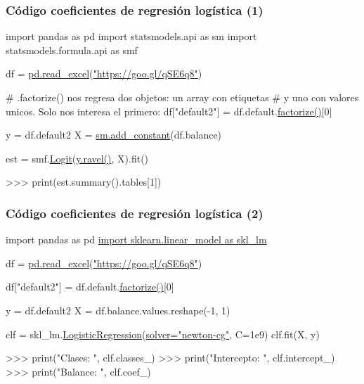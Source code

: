 \documentclass[usenames,dvipsnames]{beamer} %
\begin{document}
\begin{frame}[fragile]\frametitle{C\'odigo coeficientes de regresi\'on log\'istica (1)}
\begin{semiverbatim}
	\small{\textcolor{deepblue}{import} pandas \textcolor{deepblue}{as} pd
	\textcolor{deepblue}{import} statsmodels.api \textcolor{deepblue}{as} sm
	\textcolor{deepblue}{import} statsmodels.formula.api \textcolor{deepblue}{as} smf
	
	df = \href{https://pandas.pydata.org/pandas-docs/stable/reference/api/pandas.read_excel.html}{pd.read\_excel}(\href{https://goo.gl/qSE6q8}{"https://goo.gl/qSE6q8"})
	
	# .factorize() nos regresa dos objetos: un array con etiquetas
	# y uno con valores unicos. Solo nos interesa el primero:
	df["default2"] = df.default.\href{https://pandas.pydata.org/pandas-docs/version/0.23.4/generated/pandas.factorize.html}{factorize()}[0]
	
	y = df.default2
	X = \href{http://www.statsmodels.org/devel/generated/statsmodels.tools.tools.add_constant}{sm.add\_constant}(df.balance)
	
	est = smf.\href{https://www.statsmodels.org/dev/generated/statsmodels.discrete.discrete_model.Logit.html}{Logit}(\href{https://docs.scipy.org/doc/numpy-1.15.0/reference/generated/numpy.ravel.html}{y.ravel()}, X).fit()
	
	>>> print(est.summary().tables[1])
}
\end{semiverbatim}
\end{frame}

\begin{frame}[fragile]\frametitle{C\'odigo coeficientes de regresi\'on log\'istica (2)}
\begin{semiverbatim}
	\small{\textcolor{deepblue}{import} pandas \textcolor{deepblue}{as} pd
		\href{https://scikit-learn.org/stable/modules/classes.html#module-sklearn.linear_model}{\textcolor{deepblue}{import} sklearn.linear\_model \textcolor{deepblue}{as} skl\_lm}
		
		df = \href{https://pandas.pydata.org/pandas-docs/stable/reference/api/pandas.read_excel.html}{pd.read\_excel}(\href{https://goo.gl/qSE6q8}{"https://goo.gl/qSE6q8"})
		
		df["default2"] = df.default.\href{https://pandas.pydata.org/pandas-docs/version/0.23.4/generated/pandas.factorize.html}{factorize()}[0]
		
		y = df.default2
		X = df.balance.values.reshape(-1, 1)
		
		clf = skl\_lm.\href{https://scikit-learn.org/stable/modules/generated/sklearn.linear_model.LogisticRegression.html}{LogisticRegression}(\href{https://stackoverflow.com/a/52388406}{solver="newton-cg"}, C=1e9)
		clf.fit(X, y)
		
		>>> print("Clases: ", clf.classes\_)
		>>> print("Intercepto: ", clf.intercept\_)
		>>> print("Balance: ", clf.coef\_)
	}
\end{semiverbatim}
\end{frame}
\end{document}
